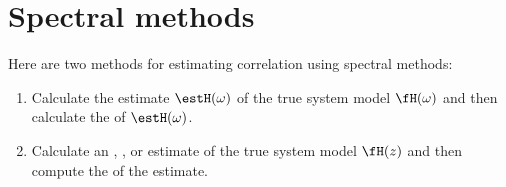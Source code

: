 \section{Spectral methods}
Here are two methods for estimating correlation using spectral methods:
\begin{enumerate}
  \item Calculate the estimate $\estH(\omega)$  of the true system model $\fH(\omega)$
        and then calculate the  of $\estH(\omega)$.
  \item Calculate an , , or  estimate of the true system model $\fH(z)$ and then 
        compute the  of the estimate.\footnotemark
\end{enumerate}

